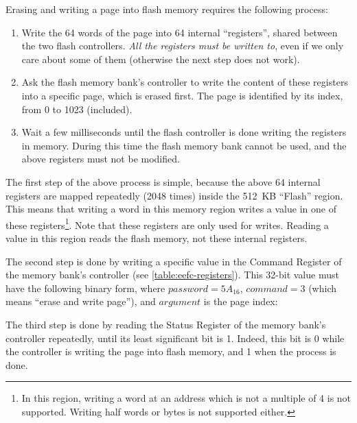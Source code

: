 Erasing and writing a page into flash memory requires the following process:
\begin{enumerate}
  \item Write the 64 words of the page into 64 internal ``registers'', shared
  between the two flash controllers. {\em All the registers must be written
  to}, even if we only care about some of them (otherwise the next step does
  not work).

  \item Ask the flash memory bank's controller to write the content of these
  registers into a specific page, which is erased first. The page is identified
  by its index, from 0 to 1023 (included).

  \item Wait a few milliseconds until the flash controller is done writing the
  registers in memory. During this time the flash memory bank cannot be used,
  and the above registers must not be modified.
\end{enumerate}

The first step of the above process is simple, because the above 64 internal
registers are mapped repeatedly (2048 times) inside the 512~KB ``Flash'' region.
This means that writing a word in this memory region writes a value in one of
these registers\footnote{In this region, writing a word at an address which is
not a multiple of 4 is not supported. Writing half words or bytes is not
supported either.}. Note that these registers are only used for writes. Reading
a value in this region reads the flash memory, not these internal registers.

The second step is done by writing a specific value in the Command Register of
the memory bank's controller (see \cref{table:eefc-registers}). This 32-bit
value must have the following binary form, where $password=5A_{16}$,
$command=3$ (which means ``erase and write page''), and $argument$ is the page
index:

\begin{flushright}
\end{flushright}

The third step is done by reading the Status Register of the memory bank's
controller repeatedly, until its least significant bit is 1. Indeed, this bit
is 0 while the controller is writing the page into flash memory, and 1 when the
process is done.

